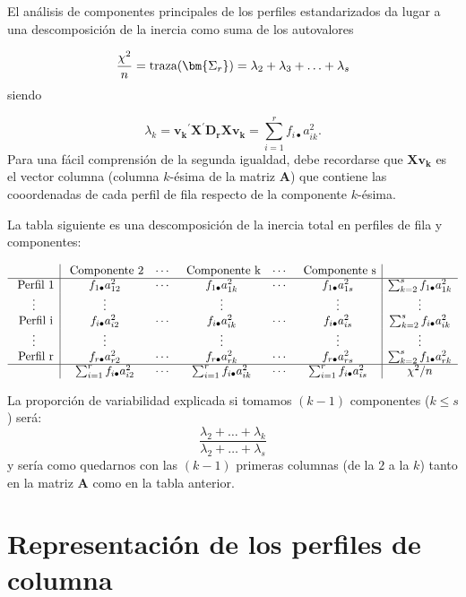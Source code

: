 \documentclass[
  a4paper,
  oneside]{scrbook}
\theoremstyle{definition}
\theoremstyle{definition}
\theoremstyle{definition}
\theoremstyle{definition}
\theoremstyle{remark}
\begin{document}
El análisis de componentes principales de los perfiles estandarizados da
lugar a una descomposición de la inercia como suma de los autovalores

\[\frac{\chi^2}{n}=\textnormal{traza}(\bm{\Sigma_r})=\lambda_2+\lambda_3+\ldots+\lambda_s\]
siendo

\[\lambda_k = \bm{v_k}^{\prime} \bm{X}^{\prime} \bm{D_r X v_k} = \sum_{i=1}^r f_{i\bullet} a_{ik}^2.\]
Para una fácil comprensión de la segunda igualdad, debe recordarse que
\(\bm{X v_k}\) es el vector columna (columna \(k\)-ésima de la matriz
\(\bm{A}\)) que contiene las cooordenadas de cada perfil de fila respecto
de la componente \(k\)-ésima.

La tabla siguiente es una descomposición de la inercia total en perfiles
de fila y componentes:

\[\begin{array}{c|ccccc|c}
 & \mbox{ Componente 2}  & \cdots & \mbox{ Componente k} & \cdots
  & \mbox{ Componente s} & \\ \hline
\mbox{ Perfil 1}
 & f_{1\bullet} a_{12}^2 & \cdots & f_{1\bullet} a_{1k}^2
& \cdots & f_{1\bullet} a_{1s}^2 & \sum_{k=2}^s f_{1\bullet} a_{1k}^2 \\
\vdots & \vdots & & \vdots & & \vdots & \vdots \\
\mbox{ Perfil i}
 & f_{i\bullet} a_{i2}^2  & \cdots & f_{i\bullet} a_{ik}^2
& \cdots & f_{i\bullet} a_{is}^2 & \sum_{k=2}^s f_{i\bullet} a_{ik}^2 \\
\vdots & \vdots  & & \vdots & & \vdots & \vdots \\
\mbox{ Perfil r}
 & f_{r\bullet} a_{r2}^2  & \cdots & f_{r\bullet} a_{rk}^2
& \cdots & f_{r\bullet} a_{rs}^2 & \sum_{k=2}^s f_{1\bullet} a_{rk}^2 \\
\hline & \sum_{i=1}^r f_{i\bullet} a_{i 2}^2 & \cdots & \sum_{i=1}^r f_{i\bullet} a_{i k}^2
& \cdots & \sum_{i=1}^r f_{i\bullet} a_{i s}^2 & \chi^2/n \end{array}\]

La proporción de variabilidad explicada si tomamos \((k-1)\) componentes
(\(k\leq s\)) será:
\[\frac{\lambda_2+\ldots+\lambda_k}{\lambda_2+\ldots+\lambda_{s}}\] y
sería como quedarnos con las \((k-1)\) primeras columnas (de la \(2\) a la
\(k\)) tanto en la matriz \(\bm{A}\) como en la tabla anterior.

\section{Representación de los perfiles de columna}\label{representacion-de-los-perfiles-de-columna}
\end{document}

